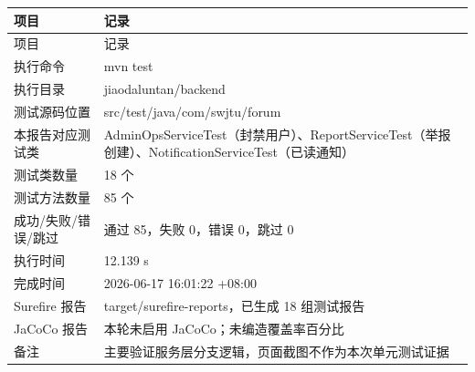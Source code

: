 \documentclass[bwprint]{report}
\begin{document}
{
\setlength{\tabcolsep}{3pt}
\begin{longtable}{P{2.8cm}P{10.0cm}}
\toprule
项目 & 记录\\
\midrule
\endfirsthead
\toprule
项目 & 记录\\
\midrule
\endhead
执行命令 & mvn test \\
执行目录 & jiaodaluntan/\hspace{0pt}backend \\
测试源码位置 & src/\hspace{0pt}test/\hspace{0pt}java/\hspace{0pt}com/\hspace{0pt}swjtu/\hspace{0pt}forum \\
本报告对应测试类 & Admin\hspace{0pt}Ops\hspace{0pt}Service\hspace{0pt}Test（封禁用户）、Report\hspace{0pt}Service\hspace{0pt}Test（举报创建）、Notification\hspace{0pt}Service\hspace{0pt}Test（已读通知） \\
测试类数量 & 18 个 \\
测试方法数量 & 85 个 \\
成功/失败/错误/跳过 & 通过 85，失败 0，错误 0，跳过 0 \\
执行时间 & 12.139 s \\
完成时间 & 2026-\hspace{0pt}06-\hspace{0pt}17 16:01:22 +08:00 \\
Surefire 报告 & target/\hspace{0pt}surefire-\hspace{0pt}reports，已生成 18 组测试报告 \\
Ja\hspace{0pt}Co\hspace{0pt}Co 报告 & 本轮未启用 Ja\hspace{0pt}Co\hspace{0pt}Co；未编造覆盖率百分比 \\
备注 & 主要验证服务层分支逻辑，页面截图不作为本次单元测试证据 \\
\bottomrule
\end{longtable}
}
\end{document}
